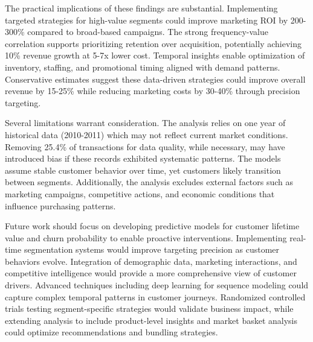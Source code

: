 \documentclass[
]{article}
\begin{document}
The practical implications of these findings are substantial.
Implementing targeted strategies for high-value segments could improve
marketing ROI by 200-300\% compared to broad-based campaigns. The strong
frequency-value correlation supports prioritizing retention over
acquisition, potentially achieving 10\% revenue growth at 5-7x lower
cost. Temporal insights enable optimization of inventory, staffing, and
promotional timing aligned with demand patterns. Conservative estimates
suggest these data-driven strategies could improve overall revenue by
15-25\% while reducing marketing costs by 30-40\% through precision
targeting.

Several limitations warrant consideration. The analysis relies on one
year of historical data (2010-2011) which may not reflect current market
conditions. Removing 25.4\% of transactions for data quality, while
necessary, may have introduced bias if these records exhibited
systematic patterns. The models assume stable customer behavior over
time, yet customers likely transition between segments. Additionally,
the analysis excludes external factors such as marketing campaigns,
competitive actions, and economic conditions that influence purchasing
patterns.

Future work should focus on developing predictive models for customer
lifetime value and churn probability to enable proactive interventions.
Implementing real-time segmentation systems would improve targeting
precision as customer behaviors evolve. Integration of demographic data,
marketing interactions, and competitive intelligence would provide a
more comprehensive view of customer drivers. Advanced techniques
including deep learning for sequence modeling could capture complex
temporal patterns in customer journeys. Randomized controlled trials
testing segment-specific strategies would validate business impact,
while extending analysis to include product-level insights and market
basket analysis could optimize recommendations and bundling strategies.
\end{document}
